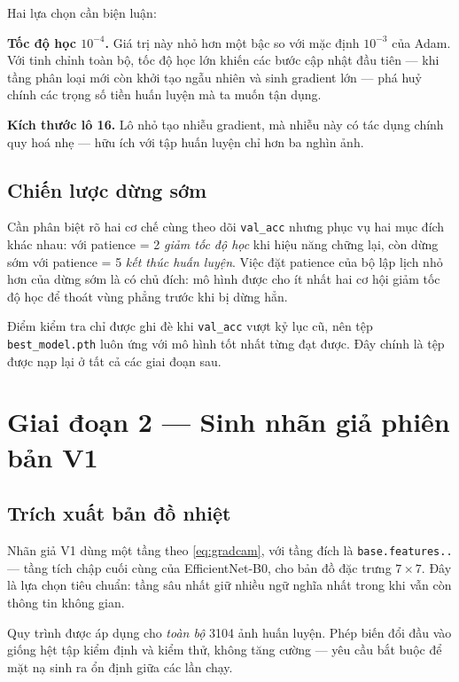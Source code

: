 Hai lựa chọn cần biện luận:

\textbf{Tốc độ học $10^{-4}$.} Giá trị này nhỏ hơn một bậc so với mặc định
$10^{-3}$ của Adam. Với tinh chỉnh toàn bộ, tốc độ học lớn khiến các bước cập nhật
đầu tiên --- khi tầng phân loại mới còn khởi tạo ngẫu nhiên và sinh gradient lớn
--- phá huỷ chính các trọng số tiền huấn luyện mà ta muốn tận dụng.

\textbf{Kích thước lô 16.} Lô nhỏ tạo nhiễu gradient, mà nhiễu này có tác dụng
chính quy hoá nhẹ --- hữu ích với tập huấn luyện chỉ hơn ba nghìn ảnh.

\subsection{Chiến lược dừng sớm}

Cần phân biệt rõ hai cơ chế cùng theo dõi \texttt{val\_acc} nhưng phục vụ hai mục
đích khác nhau:  với patience = 2 \emph{giảm tốc độ học} khi
hiệu năng chững lại, còn dừng sớm với patience = 5 \emph{kết thúc huấn luyện}. Việc
đặt patience của bộ lập lịch nhỏ hơn của dừng sớm là có chủ đích: mô hình được cho
ít nhất hai cơ hội giảm tốc độ học để thoát vùng phẳng trước khi bị dừng hẳn.

Điểm kiểm tra chỉ được ghi đè khi \texttt{val\_acc} vượt kỷ lục cũ, nên tệp
\texttt{best\_\allowbreak model.\allowbreak pth} luôn ứng với mô hình tốt nhất từng đạt được. Đây chính là
tệp được nạp lại ở tất cả các giai đoạn sau.

\section{Giai đoạn 2 --- Sinh nhãn giả phiên bản V1}
\label{sec:pseudov1}

\subsection{Trích xuất bản đồ nhiệt}

Nhãn giả V1 dùng \GradCAM{} một tầng theo \cref{eq:gradcam}, với tầng đích là
\texttt{base.\allowbreak features..} --- tầng tích chập cuối cùng của EfficientNet-B0, cho
bản đồ đặc trưng $7 \times 7$. Đây là lựa chọn tiêu chuẩn: tầng sâu nhất giữ nhiều
ngữ nghĩa nhất trong khi vẫn còn thông tin không gian.

Quy trình được áp dụng cho \emph{toàn bộ} \num{3104} ảnh huấn luyện. Phép biến đổi
đầu vào giống hệt tập kiểm định và kiểm thử, không tăng cường --- yêu cầu bắt buộc
để mặt nạ sinh ra ổn định giữa các lần chạy.

